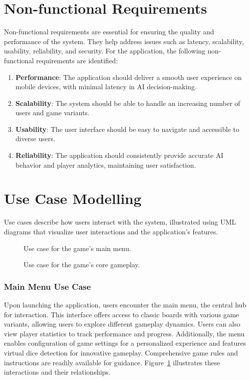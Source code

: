 \section{Non-functional Requirements}
Non-functional requirements are essential for ensuring the quality and performance of the system. They help address issues such as latency, scalability, usability, reliability, and security. For the application, the following non-functional requirements are identified:
\begin{enumerate}
\item {\bfseries Performance}: The application should deliver a smooth user experience on mobile devices, with minimal latency in AI decision-making.
\item {\bfseries Scalability}: The system should be able to handle an increasing number of users and game variants.
\item {\bfseries Usability}: The user interface should be easy to navigate and accessible to diverse users.
\item {\bfseries Reliability}: The application should consistently provide accurate AI behavior and player analytics, maintaining user satisfaction.
\end{enumerate}

\section{Use Case Modelling}
Use cases describe how users interact with the system, illustrated using UML diagrams that visualize user interactions and the application's features.

\begin{figure}[h]
    \centering
    
    \caption{Use case for the game's main menu.}
    \label{fig:main_menu_usecase}
\end{figure}

\begin{figure}[h]
    \centering
    
    \caption{Use case for the game's core gameplay.}
    \label{fig:game_usecase}
\end{figure}

\subsubsection{Main Menu Use Case}
Upon launching the application, users encounter the main menu, the central hub for interaction. This interface offers access to classic boards with various game variants, allowing users to explore different gameplay dynamics. Users can also view player statistics to track performance and progress. Additionally, the menu enables configuration of game settings for a personalized experience and features virtual dice detection for innovative gameplay. Comprehensive game rules and instructions are readily available for guidance. Figure~\ref{fig:main_menu_usecase} illustrates these interactions and their relationships.

